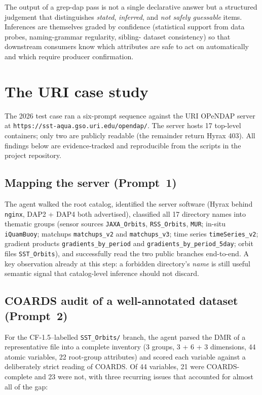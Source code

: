 \documentclass[11pt]{article}
\begin{document}
The output of a grep-dap pass is not a single declarative answer
but a structured judgement that distinguishes
\emph{stated}, \emph{inferred}, and \emph{not safely guessable}
items. Inferences are themselves graded by confidence (statistical
support from data probes, naming-grammar regularity, sibling-
dataset consistency) so that downstream consumers know which
attributes are safe to act on automatically and which require
producer confirmation.

\section{The URI case study}\label{sec:case}

The 2026 test case ran a six-prompt sequence against the URI
OPeNDAP server at \texttt{https://sst-aqua.gso.uri.edu/opendap/}.
The server hosts 17 top-level containers; only two are publicly
readable (the remainder return Hyrax 403). All findings below
are evidence-tracked and reproducible from the scripts in the
project repository.

\subsection{Mapping the server (Prompt~1)}

The agent walked the root catalog, identified the server software
(Hyrax behind \texttt{nginx}, DAP2 + DAP4 both advertised),
classified all 17 directory names into thematic groups (sensor
sources \texttt{JAXA\_Orbits}, \texttt{RSS\_Orbits}, \texttt{MUR};
in-situ \texttt{iQuamBuoy}; matchups \texttt{matchups\_v2}
and \texttt{matchups\_v3};
time series \texttt{timeSeries\_v2}; gradient products
\texttt{gradients\_by\_period} and
\texttt{gradients\_by\_period\_5day}; orbit files
\texttt{SST\_Orbits}), and successfully read the two public
branches end-to-end. A key observation already at this step: a
forbidden directory's \emph{name} is still useful semantic signal
that catalog-level inference should not discard.

\subsection{COARDS audit of a well-annotated dataset (Prompt~2)}

For the CF-1.5--labelled \texttt{SST\_Orbits/} branch, the agent
parsed the DMR of a representative file into a complete inventory
(3 groups, 3 + 6 + 3 dimensions, 44 atomic variables, 22
root-group attributes) and scored each variable against a
deliberately strict reading of COARDS. Of 44 variables, 21 were
COARDS-complete and 23 were not, with three recurring issues that
accounted for almost all of the gap:
\end{document}
